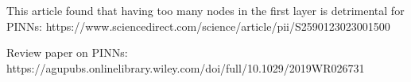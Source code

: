 This article found that having too many nodes in the first layer is detrimental for PINNs:
https://www.sciencedirect.com/science/article/pii/S2590123023001500

Review paper on PINNs: https://agupubs.onlinelibrary.wiley.com/doi/full/10.1029/2019WR026731
